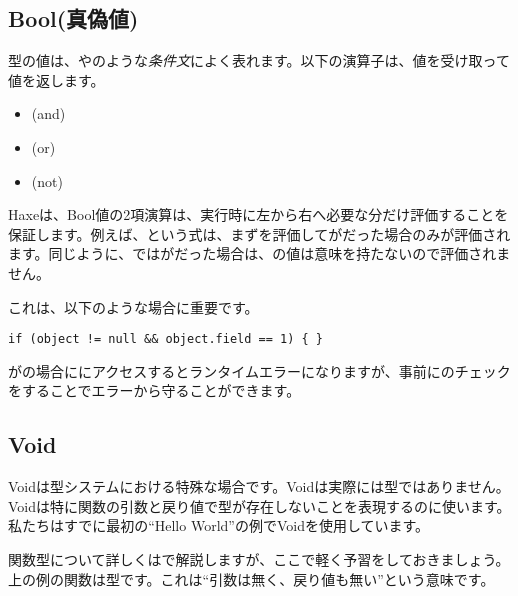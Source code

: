 \subsection{Bool(真偽値)}
\label{types-bool}


型の値は、やのような\emph{条件文}によく表れます。以下の演算子は、値を受け取って値を返します。

\begin{itemize}
	\item \expr{\&\&} (and)
	\item \expr{||} (or)
	\item \expr{!} (not)
\end{itemize}

Haxeは、Bool値の2項演算は、実行時に左から右へ必要な分だけ評価することを保証します。例えば、という式は、まずを評価してがだった場合のみが評価されます。同じように、ではがだった場合は、の値は意味を持たないので評価されません。

これは、以下のような場合に重要です。

\begin{lstlisting}
if (object != null && object.field == 1) { }
\end{lstlisting}

がの場合ににアクセスするとランタイムエラーになりますが、事前にのチェックをすることでエラーから守ることができます。

\subsection{Void}
\label{types-void}


Voidは型システムにおける特殊な場合です。Voidは実際には型ではありません。Voidは特に関数の引数と戻り値で型が存在しないことを表現するのに使います。私たちはすでに最初の``Hello World''の例でVoidを使用しています。


関数型について詳しくはで解説しますが、ここで軽く予習をしておきましょう。上の例の関数は型です。これは``引数は無く、戻り値も無い''という意味です。

